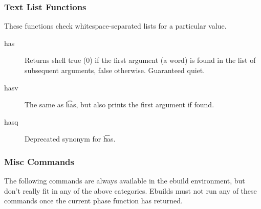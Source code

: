 \subsubsection{Text List Functions}
These functions check whitespace-separated lists for a particular value.

\begin{description}
\item[has] Returns shell true (0) if the first argument (a word) is found in the list of subsequent
    arguments, false otherwise. Guaranteed quiet.
\item[hasv] The same as \t{has}, but also prints the first argument if found.
\item[hasq] Deprecated synonym for \t{has}.
\end{description}

\subsubsection{Misc Commands}
The following commands are always available in the ebuild environment, but don't really fit in any
of the above categories. Ebuilds must not run any of these commands once the current phase function
has returned.


